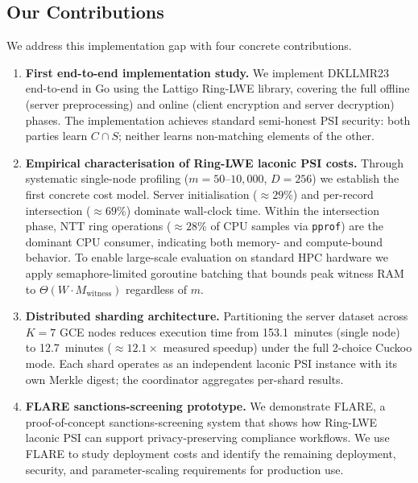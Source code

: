\documentclass[preprint,12pt]{elsarticle}
\begin{document}
\subsection{Our Contributions}

We address this implementation gap with four concrete contributions.

\begin{enumerate}[leftmargin=*]

\item \textbf{First end-to-end implementation study.}
We implement DKLLMR23 end-to-end in Go using the Lattigo Ring-LWE library,
covering the full offline (server preprocessing) and online (client encryption
and server decryption) phases. The implementation achieves standard
semi-honest PSI security: both parties learn $C \cap S$; neither learns
non-matching elements of the other.

\item \textbf{Empirical characterisation of Ring-LWE laconic PSI costs.}
Through systematic single-node profiling ($m = 50$--$10{,}000$, $D=256$)
we establish the first concrete cost model.
Server initialisation ($\approx 29\%$) and per-record intersection
($\approx 69\%$) dominate wall-clock time. Within the intersection phase,
NTT ring operations ($\approx 28\%$ of CPU samples via \texttt{pprof})
are the dominant CPU consumer, indicating both memory- and compute-bound behavior. To enable
large-scale evaluation on standard HPC hardware we apply semaphore-limited
goroutine batching that bounds peak witness RAM to
$\Theta(W \cdot M_{\text{witness}})$ regardless of $m$.

\item \textbf{Distributed sharding architecture.}
Partitioning the server dataset across $K=7$ GCE nodes reduces
execution time from 153.1~minutes (single node) to 12.7~minutes
(${\approx}12.1\times$ measured speedup) under the full 2-choice Cuckoo
mode. Each shard operates as an
independent laconic PSI instance with its own Merkle digest; the coordinator
aggregates per-shard results.

\item \textbf{FLARE sanctions-screening prototype.}
We demonstrate FLARE, a proof-of-concept sanctions-screening system that
shows how Ring-LWE laconic PSI can support privacy-preserving compliance
workflows. We use FLARE to study deployment costs and identify the
remaining deployment, security, and parameter-scaling requirements for production use.

\end{enumerate}
\end{document}
